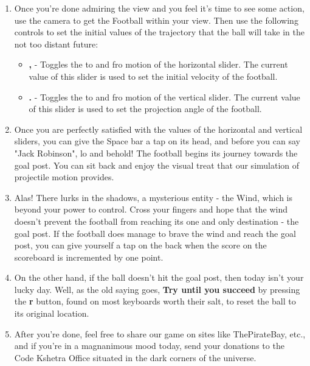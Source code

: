 \documentclass[12pt]{article} %
\begin{document}
\begin{enumerate}
\item{Once you're done admiring the view and you feel it's time to see some action, use the camera to get the Football within your view. Then use the following controls to set the initial values of the trajectory that the ball will take in the not too distant future:}
\begin{itemize}
\item{\textbf{,} - Toggles the to and fro motion of the  horizontal slider. The current value of this slider is used to set the initial velocity of the football.}
\item{\textbf{.} - Toggles the to and fro motion of the  vertical slider. The current value of this slider is used to set the projection angle of the football.}
\end{itemize}

\item{Once you are perfectly satisfied with the values of the horizontal and vertical sliders, you can give the Space bar a tap on its head, and before you can say "Jack Robinson", lo and behold! The football begins its journey towards the goal post. You can sit back and enjoy the visual treat that our simulation of projectile motion provides.}

\item{Alas! There lurks in the shadows, a mysterious entity - the Wind, which is beyond your power to control. Cross your fingers and hope that the wind doesn't prevent the football from reaching its one and only destination - the goal post. If the football does manage to brave the wind and reach the goal post, you can give yourself a tap on the back when the score on the scoreboard is incremented by one point.}

\item{On the other hand, if the ball doesn't hit the goal post, then today isn't your lucky day. Well, as the old saying goes, \textbf{Try until you succeed} by pressing the \textbf{r} button, found on most keyboards worth their salt, to reset the ball to its original location.}

\item{After you're done, feel free to share our game on sites like ThePirateBay, etc., and if you're in a magnanimous mood today, send your donations to the Code Kshetra Office situated in the dark corners of the universe.}

\end{enumerate}
\end{document}
